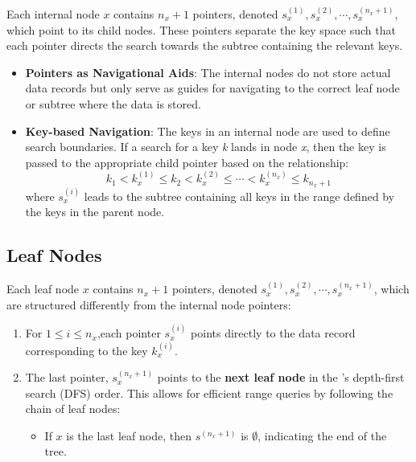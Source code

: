 Each internal node $x$ contains $n_x + 1$ pointers, denoted  $s^{(1)}_x,s^{(2)}_x,\cdots,s^{(n_x + 1)}_x$, which point to its child nodes. These pointers separate the key space such that each pointer directs the search towards the subtree containing the relevant keys.
        \begin{itemize}
            \item \textbf{Pointers as Navigational Aids}: The internal nodes do not store actual data records but only serve as guides for navigating to the correct leaf node or subtree where the data is stored.
        \end{itemize}
        \begin{itemize}
            \item \textbf{Key-based Navigation}: The keys in an internal node are used to define search boundaries. If a search for a key \textit{k} lands in node \textit{x}, then the key is passed to the appropriate child pointer based on the relationship: $$k_1<k_x^{(1)}\le k_2<k_x^{(2)}\le \cdots <k_x^{(n_x)}\le k_{n_x+1}$$
where $s^{(i)}_x$ leads to the subtree containing all keys in the range defined by the keys in the parent node.
        \end{itemize}

\subsection{Leaf Nodes}

Each leaf node $x$ contains $n_x + 1$ pointers, denoted $s^{(1)}_x,s^{(2)}_x,\cdots,s^{(n_x + 1)}_x$, which are structured differently from the internal node pointers:

        \begin{enumerate}
            \item For $1\le i\le n_x$,each pointer $s^{(i)}_x$ points directly to the data record corresponding to the key $k_x^{(i)}$.
            \item The last pointer, $s^{(n_x+1)}_x$ points to the \textbf{next leaf node} in the \bplustree's depth-first search (DFS) order. This allows for efficient range queries by following the chain of leaf nodes:\begin{itemize}
            \item If $x$ is the last leaf node, then $s^{(n_x+1)}$ is $\emptyset$, indicating the end of the tree.\end{itemize}
        \end{enumerate}


